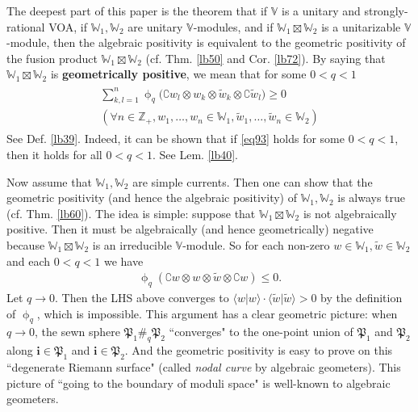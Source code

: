 \documentclass[11pt,b5paper,notitlepage]{article}
\theoremstyle{definition}
\theoremstyle{plain}
\newcommand{\fk}{\mathfrak}
\newcommand{\wtd}{\widetilde}
\newcommand{\bk}[1]{\langle {#1}\rangle}
\newcommand{\im}{\mathbf{i}}
\newcommand{\Co}{\complement}
\newcommand{\Vbb}{\mathbb V}
\newcommand{\Wbb}{\mathbb W}
\newcommand{\Zbb}{\mathbb Z}
\numberwithin{equation}{section}
\begin{document}
The deepest part of this paper is the theorem that if $\Vbb$ is a unitary and strongly-rational VOA, if $\Wbb_1,\Wbb_2$ are unitary $\Vbb$-modules, and if $\Wbb_1\boxtimes\Wbb_2$ is a unitarizable $\Vbb$-module, then the algebraic positivity is equivalent to the geometric positivity of the fusion product $\Wbb_1\boxtimes\Wbb_2$  (cf. Thm. \ref{lb50} and Cor. \ref{lb72}). By saying that $\Wbb_1\boxtimes\Wbb_2$ is \textbf{geometrically positive}, we mean that for some $0<q<1$
\begin{gather}\label{eq93}
\begin{gathered}
\sum_{k,l=1}^n\upphi_q\big(\Co w_l\otimes  w_k\otimes  \wtd w_k \otimes \Co\wtd w_l\big)\geq0\\
(\forall n\in\Zbb_+, w_1,\dots,w_n\in\Wbb_1,\wtd w_1,\dots,\wtd w_n\in\Wbb_2) 
\end{gathered}
\end{gather}
See Def. \ref{lb39}. Indeed, it can be shown that if \eqref{eq93} holds for some $0<q<1$, then it holds for all $0<q<1$. See Lem. \ref{lb40}.

Now assume that $\Wbb_1,\Wbb_2$ are simple currents. Then one can show that the geometric positivity (and hence the algebraic positivity) of $\Wbb_1,\Wbb_2$ is always true (cf. Thm. \ref{lb60}). The idea is simple: suppose that $\Wbb_1\boxtimes\Wbb_2$ is not algebraically positive. Then it must be algebraically (and hence geometrically) negative because $\Wbb_1\boxtimes\Wbb_2$ is an irreducible $\Vbb$-module. So for each non-zero $w\in\Wbb_1,\wtd w\in\Wbb_2$ and each $0<q<1$ we have
\begin{align*}
\upphi_q(\Co w\otimes w\otimes\wtd w\otimes\Co w)\leq 0.
\end{align*}
Let $q\rightarrow0$. Then the LHS above converges to $\bk{w|w}\cdot \bk{\wtd w|\wtd w}>0$ by the definition of $\upphi_q$, which is impossible. This argument has a clear geometric picture: when $q\rightarrow0$, the sewn sphere $\fk P_1\#_q\fk P_2$ ``converges" to the one-point union of $\fk P_1$ and $\fk P_2$ along $\im\in\fk P_1$ and $\im\in\fk P_2$. And the geometric positivity is easy to prove on this ``degenerate Riemann surface" (called \emph{nodal curve} by algebraic geometers). This picture of ``going to the boundary of moduli space" is well-known to algebraic geometers.
\end{document}

